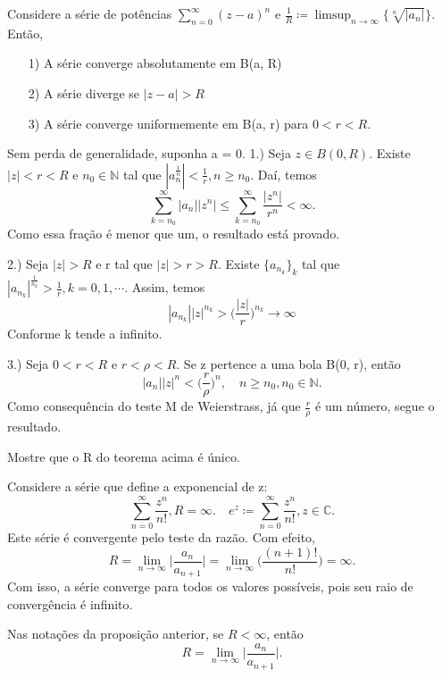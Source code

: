 \documentclass[ComplexAnalysis/complex.tex]{subfiles}
\begin{document}
\begin{theorem*}
	Considere a série de potências $\sum\limits_{n=0}^{\infty}(z-a)^n$ e $\frac{1}{R}\coloneqq \limsup_{n\to\infty}\{\sqrt[n]{|a_n|}\}$.
	Então,
	\begin{itemize}
		\item[1)] A série converge absolutamente em B(a, R)
		\item[2)] A série diverge se $|z-a| > R$
		\item[3)] A série converge uniformemente em B(a, r) para $0 < r < R.$
	\end{itemize}
\end{theorem*}
\begin{proof*}
	Sem perda de generalidade, suponha a = 0.
	1.) Seja $z\in{B(0, R)}.$ Existe $|z| < r < R$ e $n_0\in\mathbb{N}$ tal que $|a_n^{\frac{1}{n}}| < \frac{1}{r},
		n\geq{n_0}.$ Daí, temos
	$$
		\sum_{k=n_0}^{\infty}|a_n||z^n|\leq \sum_{k=n_0}^{\infty}\frac{|z^n|}{r^n} < \infty.
	$$
	Como essa fração é menor que um, o resultado está provado.

	2.) Seja $|z| > R$ e r tal que $|z|> r > R$. Existe $\{a_{n_k}\}_k$ tal que $|a_{n_k}|^{\frac{1}{n_k}} > \frac{1}{r},
		k = 0, 1, \cdots.$ Assim, temos
	$$
		|a_{n_k}||z|^{n_k} > \biggl(\frac{|z|}{r}\biggr)^{n_k}\to\infty
	$$
	Conforme k tende a infinito.

	3.) Seja $0 < r < R \text{ e } r < \rho < R.$ Se z pertence a uma bola B(0, r), então
	$$
		|a_n||z|^n < \biggl(\frac{r}{\rho}\biggr)^n, \quad n\geq{n_0}, n_0\in\mathbb{N}.
	$$
	Como consequência do teste M de Weierstrass, já que $\frac{r}{\rho}$ é um número, segue
	o resultado.
	\qedsymbol
\end{proof*}
\begin{exer*}
	Mostre que o R do teorema acima é único.
\end{exer*}
\begin{example}
	Considere a série que define a exponencial de z:
	$$
		\sum_{n=0}^{\infty}\frac{z^n}{n!}, R = \infty.\quad e^z\coloneqq \sum_{n=0}^{\infty}\frac{z^n}{n!}, z\in\mathbb{C}.
	$$
	Este série é convergente pelo teste da razão. Com efeito,
	$$
		R = \lim_{n\to\infty}\biggl|\frac{a_n}{a_{n+1}}\biggr| = \lim_{n\to\infty}\biggl(\frac{(n+1)!}{n!}\biggr) = \infty.
	$$
	Com isso, a série converge para todos os valores possíveis, pois seu raio de convergência
	é infinito.
\end{example}
\begin{prop*}
	Nas notações da proposição anterior, se $R < \infty$, então
	$$
		R = \lim_{n\to\infty}\biggl|\frac{a_n}{a_{n+1}}\biggr|.
	$$
\end{prop*}
\end{document}
